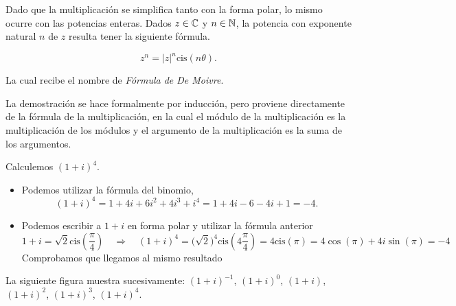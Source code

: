 Dado que la multiplicación se simplifica tanto con la forma polar, lo mismo ocurre con las potencias enteras.		
Dados $z \in \mathbb{C}$ y $n \in \mathbb{N}$, la potencia con exponente natural $n$ de $z$ resulta tener la siguiente fórmula.

$$    z^n = |z|^n \mbox{cis}(n \theta).$$
    
La cual recibe el nombre de {\em F\'ormula de De Moivre}.
    
 La demostración se hace formalmente por inducción, pero proviene directamente de la fórmula de la multiplicación, en la cual el módulo de la multiplicación es la multiplicación de los módulos y el argumento de la multiplicación es la suma de los argumentos.

\begin{ejemplo}{}{}
    Calculemos  $(1+i)^4$.
    
    \begin{itemize}
        \item Podemos utilizar la f\'ormula del binomio,
        \[
            (1+i)^4 = 1 + 4 i + 6 i^2 + 4 i^3 + i^4 = 
                1 + 4 i - 6 - 4 i + 1 = - 4.
        \]
        
        \item Podemos escribir a $1+i$ en forma polar y utilizar la f\'ormula anterior
        \[
            1 + i = \sqrt{2} \mbox{cis}\left(\frac{\pi}{4}\right) 
            \quad \Longrightarrow \quad (1+i)^4 = 
            \big( \sqrt{2} \big)^4 \mbox{cis}\left(4 \frac{\pi}{4}\right) 
            = 4 \mbox{cis}(\pi)
            =4 \cos(\pi) + 4 i \sin(\pi) = - 4
        \]
        Comprobamos que llegamos al mismo resultado
    \end{itemize}
        
    La siguiente figura muestra sucesivamente: $(1+i)^{-1}$, $(1+i)^{0}$, $(1+i)$, $(1+i)^{2}$, $(1+i)^{3}$, $(1+i)^{4}$.
        
\begin{center}
\end{center}


    
\end{ejemplo}

